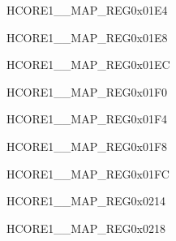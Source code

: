 \begin{register}{H}{CORE1\_\_MAP\_REG}{0x01E4}\label{regdesc:CORE1H264DMA2DINCH1INTMAPREG}
\end{register}\vspace{-3em}


\begin{register}{H}{CORE1\_\_MAP\_REG}{0x01E8}\label{regdesc:CORE1H264DMA2DINCH2INTMAPREG}
\end{register}\vspace{-3em}


\begin{register}{H}{CORE1\_\_MAP\_REG}{0x01EC}\label{regdesc:CORE1H264DMA2DINCH3INTMAPREG}
\end{register}\vspace{-3em}


\begin{register}{H}{CORE1\_\_MAP\_REG}{0x01F0}\label{regdesc:CORE1H264DMA2DINCH4INTMAPREG}
\end{register}\vspace{-3em}


\begin{register}{H}{CORE1\_\_MAP\_REG}{0x01F4}\label{regdesc:CORE1H264DMA2DINCH5INTMAPREG}
\end{register}\vspace{-3em}


\begin{register}{H}{CORE1\_\_MAP\_REG}{0x01F8}\label{regdesc:CORE1H264REGINTMAPREG}
\end{register}\vspace{-3em}


\begin{register}{H}{CORE1\_\_MAP\_REG}{0x01FC}\label{regdesc:CORE1ASSISTDEBUGINTMAPREG}
\end{register}\vspace{-3em}

\begin{register}{H}{CORE1\_\_MAP\_REG}{0x0214}\label{regdesc:CORE1DMA2DINCH2INTMAPREG}
\end{register}\vspace{-3em}


\begin{register}{H}{CORE1\_\_MAP\_REG}{0x0218}\label{regdesc:CORE1DMA2DOUTCH3INTMAPREG}
\end{register}\vspace{-3em}


